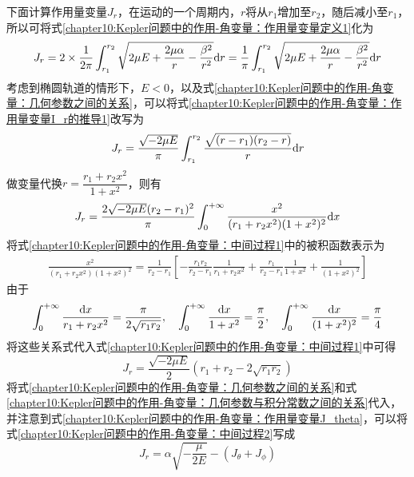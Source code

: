 下面计算作用量变量$J_r$，在运动的一个周期内，$r$将从$r_1$增加至$r_2$，随后减小至$r_1$，所以可将式\eqref{chapter10:Kepler问题中的作用-角变量：作用量变量定义1}化为
\begin{equation}
	J_r = 2\times\frac{1}{2\pi} \int_{r_1}^{r_2} \sqrt{2\mu E+\frac{2\mu\alpha}{r}-\frac{\beta^2}{r^2}} \mathrm{d} r = \frac{1}{\pi} \int_{r_1}^{r_2} \sqrt{2\mu E+\frac{2\mu\alpha}{r}-\frac{\beta^2}{r^2}} \mathrm{d} r
	\label{chapter10:Kepler问题中的作用-角变量：作用量变量I_r的推导1}
\end{equation}
考虑到椭圆轨道的情形下，$E<0$，以及式\eqref{chapter10:Kepler问题中的作用-角变量：几何参数之间的关系}，可以将式\eqref{chapter10:Kepler问题中的作用-角变量：作用量变量I_r的推导1}改写为
\begin{equation}
	J_r = \frac{\sqrt{-2\mu E}}{\pi} \int_{r_1}^{r_2} \frac{\sqrt{(r-r_1)(r_2-r)}}{r}\mathrm{d} r
\end{equation}
做变量代换$r=\dfrac{r_1+r_2x^2}{1+x^2}$，则有
\begin{equation}
	J_r = \frac{2\sqrt{-2\mu E}(r_2-r_1)^2}{\pi} \int_0^{+\infty} \frac{x^2}{(r_1+r_2x^2)(1+x^2)^2}\mathrm{d} x
	\label{chapter10:Kepler问题中的作用-角变量：中间过程1}
\end{equation}
将式\eqref{chapter10:Kepler问题中的作用-角变量：中间过程1}中的被积函数表示为
\begin{align*}
	\frac{x^2}{(r_1+r_2x^2)(1+x^2)^2} = \frac{1}{r_2-r_1}\left[-\frac{r_1r_2}{r_2-r_1} \frac{1}{r_1+r_2x^2} + \frac{r_1}{r_2-r_1} \frac{1}{1+x^2} + \frac{1}{(1+x^2)^2}\right]
\end{align*}
由于
\begin{equation*}
	\int_0^{+\infty} \frac{\mathrm{d} x}{r_1+r_2x^2} = \frac{\pi}{2\sqrt{r_1r_2}},\quad \int_0^{+\infty} \frac{\mathrm{d} x}{1+x^2} = \frac\pi2,\quad \int_0^{+\infty} \frac{\mathrm{d} x}{(1+x^2)^2} = \frac\pi4
\end{equation*}
将这些关系式代入式\eqref{chapter10:Kepler问题中的作用-角变量：中间过程1}中可得
\begin{equation}
	J_r = \frac{\sqrt{-2\mu E}}{2}(r_1+r_2-2\sqrt{r_1r_2})
	\label{chapter10:Kepler问题中的作用-角变量：中间过程2}
\end{equation}
将式\eqref{chapter10:Kepler问题中的作用-角变量：几何参数之间的关系}和式\eqref{chapter10:Kepler问题中的作用-角变量：几何参数与积分常数之间的关系}代入，并注意到式\eqref{chapter10:Kepler问题中的作用-角变量：作用量变量J_theta}，可以将式\eqref{chapter10:Kepler问题中的作用-角变量：中间过程2}写成
\begin{equation}
	J_r = \alpha\sqrt{-\frac{\mu}{2E}} - (J_\theta+J_\phi)
	\label{chapter10:Kepler问题中的作用-角变量：作用量变量J_r}
\end{equation}
